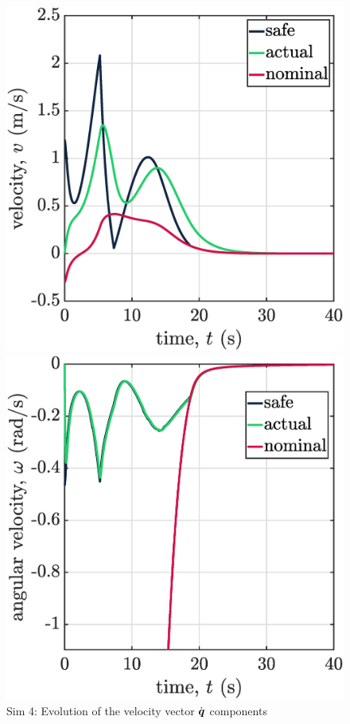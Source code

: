 \begin{figure}[!ht]
    \begin{minipage}[t]{.45\textwidth}
        \centering
        \includegraphics[width=\textwidth]{figures/sim4v1.eps}
    \end{minipage}
    \hfill
    \begin{minipage}[t]{.45\textwidth}
        \centering
        \includegraphics[width=\textwidth]{figures/sim4v2.eps}
    \end{minipage}  
    \caption{\label{fig:sim4v}Sim 4: Evolution of the velocity vector $\dot{\boldsymbol{q}}$ components}
    

\end{figure}
